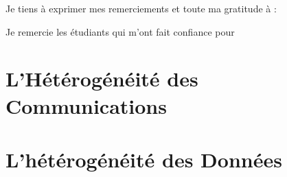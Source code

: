 \documentclass[final,twoside]{hdr} %
\begin{document}
\begin{thanks}
{Je tiens à exprimer mes remerciements et toute ma gratitude à :}

%
%
%
%
%
\item Je remercie les étudiants qui m'ont fait confiance pour
%
\end{thanks}

\tableofcontents




\chapter{L'Hétérogénéité des Communications}



\chapter{L'hétérogénéité des Données}
\end{document}
